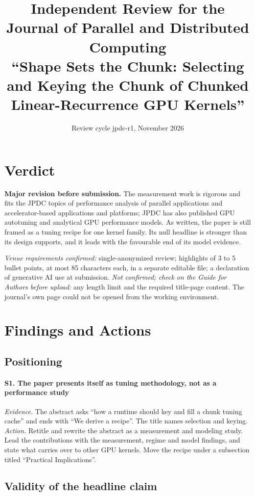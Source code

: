 \documentclass[11pt]{article}
\title{Independent Review for the Journal of Parallel and Distributed Computing\\
\large ``Shape Sets the Chunk: Selecting and Keying the Chunk of Chunked Linear-Recurrence GPU Kernels''}
\author{}
\date{Review cycle jpdc-r1, November 2026}
\newcommand{\finding}[2]{\paragraph{#1. #2}}
\newcommand{\evidence}{\textit{Evidence.} }
\newcommand{\action}{\textit{Action.} }
\begin{document}
\maketitle

\section{Verdict}
\textbf{Major revision before submission.} The measurement work is rigorous and fits
the JPDC topics of performance analysis of parallel applications and accelerator-based
applications and platforms; JPDC has also published GPU autotuning and analytical GPU
performance models. As written, the paper is still framed as a tuning recipe for one
kernel family. Its null headline is stronger than its design supports, and it leads
with the favourable end of its model evidence.

\textit{Venue requirements confirmed:} single-anonymized review; highlights of 3 to 5
bullet points, at most 85 characters each, in a separate editable file; a declaration
of generative AI use at submission.
\textit{Not confirmed; check on the Guide for Authors before upload:} any length limit
and the required title-page content. The journal's own page could not be opened from
the working environment.

\section{Findings and Actions}

\subsection*{Positioning}

\finding{S1}{The paper presents itself as tuning methodology, not as a performance study}
\evidence The abstract asks ``how a runtime should key and fill a chunk tuning cache''
and ends with ``We derive a recipe''. The title names selection and keying.\\
\action Retitle and rewrite the abstract as a measurement and modeling study. Lead the
contributions with the measurement, regime and model findings, and state what carries
over to other GPU kernels. Move the recipe under a subsection titled ``Practical
Implications''.

\subsection*{Validity of the headline claim}
\end{document}
